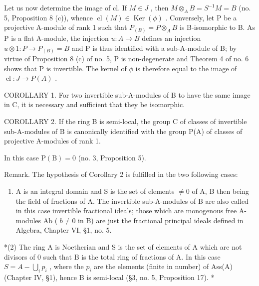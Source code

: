 Let us now determine the image of cl. If \(M \in J\) , then \(M \otimes_{A} B = S^{-1}M = B\) (no. 5, Proposition 8 (c)), whence \(\operatorname{cl}(M) \in \operatorname{Ker}(\phi)\) . Conversely, let P be a projective A-module of rank 1 such that \(P_{(B)} = P \otimes_{A} B\) is B-isomorphic to B. As P is a flat A-module, the injection \(u: A \to B\) defines an injection \(u \otimes 1: P \to P_{(B)} = B\) and P is thus identified with a sub-A-module of B; by virtue of Proposition 8 (c) of no. 5, P is non-degenerate and Theorem 4 of no. 6 shows that P is invertible. The kernel of \(\phi\) is therefore equal to the image of \(\operatorname{cl}: J \to P(A)\) .

COROLLARY 1. For two invertible sub-A-modules of B to have the same image in C, it is necessary and sufficient that they be isomorphic.

COROLLARY 2. If the ring B is semi-local, the group C of classes of invertible sub-A-modules of B is canonically identified with the group P(A) of classes of projective A-modules of rank 1.

In this case \(\mathrm{P(B)} = 0\) (no. 3, Proposition 5).

Remark. The hypothesis of Corollary 2 is fulfilled in the two following cases:

\begin{enumerate}
\def\labelenumi{(\arabic{enumi})}
\tightlist
\item
  A is an integral domain and S is the set of elements \(\neq0\) of A, B then being the field of fractions of A. The invertible sub-A-modules of B are also called in this case invertible fractional ideals; those which are monogenous free A-modules Ab ( \(b\neq0\) in B) are just the fractional principal ideals defined in Algebra, Chapter VI, §1, no. 5.
\end{enumerate}

*(2) The ring A is Noetherian and S is the set of elements of A which are not divisors of 0 such that B is the total ring of fractions of A. In this case \(S = A - \bigcup_{i} p_i\) , where the \(p_i\) are the elements (finite in number) of Ass(A) (Chapter IV, §1), hence B is semi-local (§3, no. 5, Proposition 17). *



